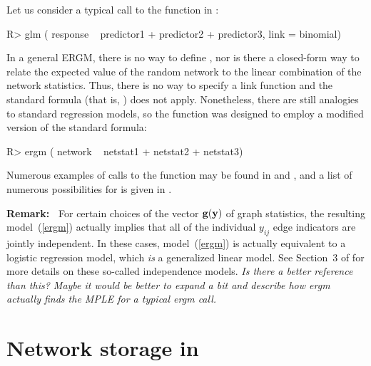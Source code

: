 \documentclass[article]{jss}
\def\vec#1{\mathchoice{\mbox{\boldmath$\displaystyle\bf#1$}}
{\mbox{\boldmath$\textstyle\bf#1$}}
{\mbox{\boldmath$\scriptstyle\bf#1$}}
{\mbox{\boldmath$\scriptscriptstyle\bf#1$}}}
\begin{document}
Let us consider a typical call to the  function in :
\begin{CodeChunk}
\begin{CodeInput}
R> glm ( response ~ predictor1 + predictor2 + predictor3, link = binomial)
\end{CodeInput}
\end{CodeChunk}
In a general ERGM, there
is no way to define ,
nor is there a closed-form way to relate the expected value of the random
network to the linear combination of the network statistics.  Thus, there is
no way to specify a link function and the standard  formula
(that is, ) does not apply.  Nonetheless, there
are still analogies to standard regression models, so the
 function was designed to employ a modified version of the
standard  formula:
\begin{CodeChunk}
\begin{CodeInput}
R> ergm ( network ~ netstat1 + netstat2 + netstat3)
\end{CodeInput}
\end{CodeChunk}
Numerous examples of calls to the  function may be found in
\citet{ergmjss} and \citet{statnettutorialjss}, and a list of numerous possibilities
for  is given in \citet{ergmtermsjss}.

{\bf Remark:\ }
For certain choices of the vector $\vec g(\vec y)$ of graph statistics, the resulting
model~(\ref{ergm}) actually implies that all of the individual $y_{ij}$ edge indicators
are jointly independent.  In these cases, model~(\ref{ergm}) is actually equivalent
to a logistic regression model, which {\em is} a generalized linear model.
See Section~3 of \citet{HunGoodHan08} for more details on these so-called
independence models.
{\em Is there a better reference than this?  Maybe it would be better to expand a bit and
describe how ergm actually finds the MPLE for a typical ergm call.}


\section[Network storage in ergm]{Network storage in }
\label{networkstorage}
\end{document}
